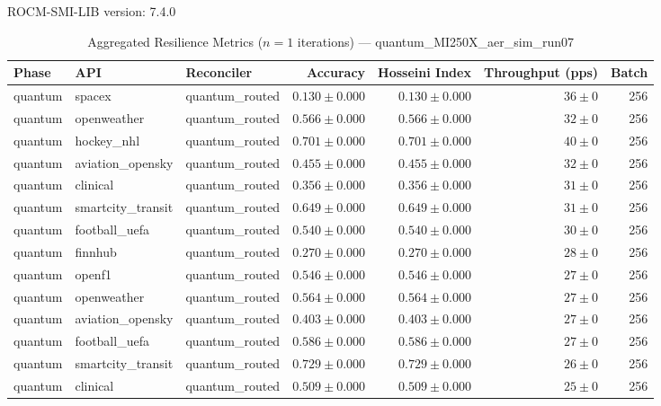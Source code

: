 ROCM-SMI-LIB version: 7.4.0

\begin{table}[htbp]
\caption{Aggregated Resilience Metrics ($n=1$ iterations) --- quantum_MI250X_aer_sim_run07}
\begin{tabular}{l l l r r r r}
\hline
Phase & API & Reconciler & Accuracy & Hosseini Index & Throughput (pps) & Batch \\
\hline
quantum & spacex & quantum\_routed & $0.130\pm0.000$ & $0.130\pm0.000$ & $36\pm0$ & 256 \\
quantum & openweather & quantum\_routed & $0.566\pm0.000$ & $0.566\pm0.000$ & $32\pm0$ & 256 \\
quantum & hockey\_nhl & quantum\_routed & $0.701\pm0.000$ & $0.701\pm0.000$ & $40\pm0$ & 256 \\
quantum & aviation\_opensky & quantum\_routed & $0.455\pm0.000$ & $0.455\pm0.000$ & $32\pm0$ & 256 \\
quantum & clinical & quantum\_routed & $0.356\pm0.000$ & $0.356\pm0.000$ & $31\pm0$ & 256 \\
quantum & smartcity\_transit & quantum\_routed & $0.649\pm0.000$ & $0.649\pm0.000$ & $31\pm0$ & 256 \\
quantum & football\_uefa & quantum\_routed & $0.540\pm0.000$ & $0.540\pm0.000$ & $30\pm0$ & 256 \\
quantum & finnhub & quantum\_routed & $0.270\pm0.000$ & $0.270\pm0.000$ & $28\pm0$ & 256 \\
quantum & openf1 & quantum\_routed & $0.546\pm0.000$ & $0.546\pm0.000$ & $27\pm0$ & 256 \\
quantum & openweather & quantum\_routed & $0.564\pm0.000$ & $0.564\pm0.000$ & $27\pm0$ & 256 \\
quantum & aviation\_opensky & quantum\_routed & $0.403\pm0.000$ & $0.403\pm0.000$ & $27\pm0$ & 256 \\
quantum & football\_uefa & quantum\_routed & $0.586\pm0.000$ & $0.586\pm0.000$ & $27\pm0$ & 256 \\
quantum & smartcity\_transit & quantum\_routed & $0.729\pm0.000$ & $0.729\pm0.000$ & $26\pm0$ & 256 \\
quantum & clinical & quantum\_routed & $0.509\pm0.000$ & $0.509\pm0.000$ & $25\pm0$ & 256 \\

\end{tabular}
\end{table}
